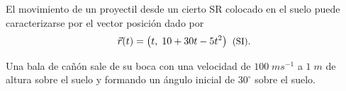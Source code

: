 \documentclass[a4paper,addpoints,14pt]{exam}
\newcommand*\chem[1]{\ensuremath{\mathrm{#1}}}
\begin{document}
\begin{questions}
	\question[2] El movimiento de un proyectil desde un cierto {\small SR} colocado en el suelo puede caracterizarse por 	el vector posición dado por
	\[\vec{r}(t)=\big(t,\;10+30t-5t^2\big)\;\;\text{\small (SI)}.\]
   
  \question[3] Una bala de cañón sale de su boca con una velocidad de $100\;ms^{-1}$ a $1\;m$ de altura sobre el suelo y formando un ángulo inicial de $30^\circ$ sobre el suelo.
%	




\end{questions}
\end{document}

